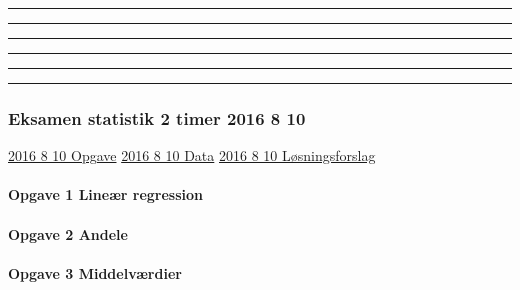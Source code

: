 \documentclass[]{book}
\let\oldparagraph\paragraph
\renewcommand{\paragraph}[1]{\oldparagraph{#1}\mbox{}}
\begin{document}
\begin{center}\rule{0.5\linewidth}{\linethickness}\end{center}

\begin{center}\rule{0.5\linewidth}{\linethickness}\end{center}

\begin{center}\rule{0.5\linewidth}{\linethickness}\end{center}

\begin{center}\rule{0.5\linewidth}{\linethickness}\end{center}

\begin{center}\rule{0.5\linewidth}{\linethickness}\end{center}

\begin{center}\rule{0.5\linewidth}{\linethickness}\end{center}

\hypertarget{eksamen-statistik-2-timer-2016-8-10}{%
\subsubsection{Eksamen statistik 2 timer 2016 8 10}\label{eksamen-statistik-2-timer-2016-8-10}}

\href{https://drive.google.com/uc?export=download\&id=0B1E7VnhxsDMlTy1NVjFBMDRLZFk}{2016 8 10 Opgave}
\href{https://drive.google.com/uc?export=download\&id=0B1E7VnhxsDMlcVdQUVFjUEp2SUE}{2016 8 10 Data}
\href{https://drive.google.com/uc?export=download\&id=0B1E7VnhxsDMlQnNjMk9XZDZKWUU}{2016 8 10 Løsningsforslag}

\hypertarget{opgave-1-liner-regression}{%
\paragraph{Opgave 1 Lineær regression}\label{opgave-1-liner-regression}}

\hypertarget{opgave-2-andele}{%
\paragraph{Opgave 2 Andele}\label{opgave-2-andele}}

\hypertarget{opgave-3-middelvrdier}{%
\paragraph{Opgave 3 Middelværdier}\label{opgave-3-middelvrdier}}
\end{document}

